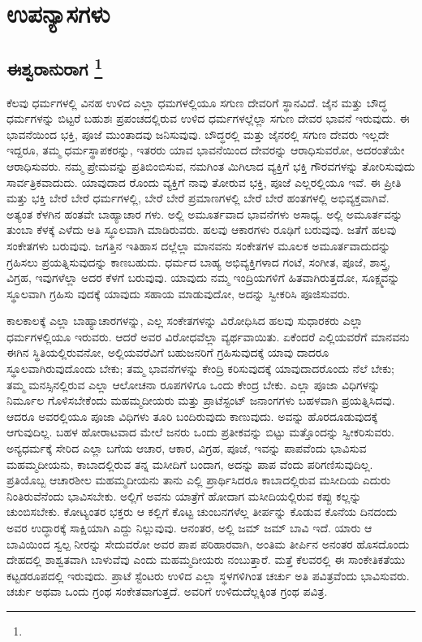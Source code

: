 

\part{ಉಪನ್ಯಾಸಗಳು}

\mainmatter

\chapter[ಈಶ್ವರಾನುರಾಗ]{ಈಶ್ವರಾನುರಾಗ \protect\footnote{}}

ಕೆಲವು ಧರ್ಮಗಳಲ್ಲಿ ವಿನಹ ಉಳಿದ ಎಲ್ಲಾ ಧಮಗಳಲ್ಲಿಯೂ ಸಗುಣ ದೇವರಿಗೆ ಸ್ಥಾನವಿದೆ. ಜೈನ ಮತ್ತು ಬೌದ್ಧ ಧರ್ಮಗಳನ್ನು ಬಿಟ್ಟರೆ ಬಹುಶಃ ಪ್ರಪಂಚದಲ್ಲಿರುವ ಉಳಿದ ಧರ್ಮಗಳಲ್ಲೆಲ್ಲಾ ಸಗುಣ ದೇವರ ಭಾವನೆ ಇರುವುದು. ಈ ಭಾವನೆಯಿಂದ ಭಕ್ತಿ, ಪೂಜೆ ಮುಂತಾದವು ಜನಿಸುವುವು. ಬೌದ್ಧರಲ್ಲಿ ಮತ್ತು ಜೈನರಲ್ಲಿ ಸಗುಣ ದೇವರು ಇಲ್ಲದೇ ಇದ್ದರೂ, ತಮ್ಮ ಧರ್ಮಸ್ಥಾಪಕರನ್ನು, ಇತರರು ಯಾವ ಭಾವನೆಯಿಂದ ದೇವರನ್ನು ಆರಾಧಿಸುವರೋ, ಅದರಂತೆಯೇ ಆರಾಧಿಸುವರು. ನಮ್ಮ ಪ್ರೇಮವನ್ನು ಪ್ರತಿಬಿಂಬಿಸುವ, ನಮಗಿಂತ ಮಿಗಿಲಾದ ವ್ಯಕ್ತಿಗೆ ಭಕ್ತಿ ಗೌರವಗಳನ್ನು ತೋರಿಸುವುದು ಸಾರ್ವತ್ರಿಕವಾದುದು. ಯಾವುದಾದ ರೊಂದು ವ್ಯಕ್ತಿಗೆ ನಾವು ತೋರುವ ಭಕ್ತಿ, ಪೂಜೆ ಎಲ್ಲರಲ್ಲಿಯೂ ಇವೆ. ಈ ಪ್ರೀತಿ ಮತ್ತು ಭಕ್ತಿ ಬೇರೆ ಬೇರೆ ಧರ್ಮಗಳಲ್ಲಿ, ಬೇರೆ ಬೇರೆ ಪ್ರಮಾಣಗಳಲ್ಲಿ ಬೇರೆ ಬೇರೆ ಹಂತಗಳಲ್ಲಿ ಅಭಿವ್ಯಕ್ತವಾಗಿವೆ. ಅತ್ಯಂತ ಕೆಳಗಿನ ಹಂತವೇ ಬಾಹ್ಯಾಚಾರ ಗಳು. ಅಲ್ಲಿ ಅಮೂರ್ತವಾದ ಭಾವನೆಗಳು ಅಸಾಧ್ಯ. ಅಲ್ಲಿ ಅಮೂರ್ತವನ್ನು ತುಂಬಾ ಕೆಳಕ್ಕೆ ಎಳೆದು ಅತಿ ಸ್ಥೂಲವಾಗಿ ಮಾಡಿರುವರು. ಹಲವು ಆಕಾರಗಳು ರೂಢಿಗೆ ಬರುವುವು. ಜತೆಗೆ ಹಲವು ಸಂಕೇತಗಳು ಬರುವುವು. ಜಗತ್ತಿನ ಇತಿಹಾಸ ದಲ್ಲೆಲ್ಲಾ ಮಾನವನು ಸಂಕೇತಗಳ ಮೂಲಕ ಅಮೂರ್ತವಾದುದನ್ನು ಗ್ರಹಿಸಲು ಪ್ರಯತ್ನಿಸುವುದನ್ನು ಕಾಣಬಹುದು. ಧರ್ಮದ ಬಾಹ್ಯ ಅಭಿವ್ಯಕ್ತಿಗಳಾದ ಗಂಟೆ, ಸಂಗೀತ, ಪೂಜೆ, ಶಾಸ್ತ್ರ, ವಿಗ್ರಹ, ಇವುಗಳೆಲ್ಲಾ ಅದರ ಕೆಳಗೆ ಬರುವುವು. ಯಾವುದು ನಮ್ಮ ಇಂದ್ರಿಯಗಳಿಗೆ ಹಿತವಾಗಿರುತ್ತದೋ, ಸೂಕ್ಷ್ಮವನ್ನು ಸ್ಥೂಲವಾಗಿ ಗ್ರಹಿಸು ವುದಕ್ಕೆ ಯಾವುದು ಸಹಾಯ ಮಾಡುವುದೋ, ಅದನ್ನು ಸ್ವೀಕರಿಸಿ ಪೂಜಿಸುವರು.

ಕಾಲಕಾಲಕ್ಕೆ ಎಲ್ಲಾ ಬಾಹ್ಯಾಚಾರಗಳನ್ನು, ಎಲ್ಲ ಸಂಕೇತಗಳನ್ನು ವಿರೋಧಿಸಿದ ಹಲವು ಸುಧಾರಕರು ಎಲ್ಲಾ ಧರ್ಮಗಳಲ್ಲಿಯೂ ಇರುವರು. ಆದರೆ ಅವರ ವಿರೋಧವೆಲ್ಲಾ ವ್ಯರ್ಥವಾಯಿತು. ಏಕೆಂದರೆ ಎಲ್ಲಿಯವರೆಗೆ ಮಾನವನು ಈಗಿನ ಸ್ಥಿತಿಯಲ್ಲಿರುವನೋ, ಅಲ್ಲಿಯವರೆವಿಗೆ ಬಹುಜನರಿಗೆ ಗ್ರಹಿಸುವುದಕ್ಕೆ ಯಾವು ದಾದರೂ ಸ್ಥೂಲವಾಗಿರುವುದೊಂದು ಬೇಕು; ತಮ್ಮ ಭಾವನೆಗಳನ್ನು ಕೇಂದ್ರಿ ಕರಿಸುವುದಕ್ಕೆ ಯಾವುದಾದರೊಂದು ನೆಲೆ ಬೇಕು; ತಮ್ಮ ಮನಸ್ಸಿನಲ್ಲಿರುವ ಎಲ್ಲಾ ಆಲೋಚನಾ ರೂಪಗಳಿಗೂ ಒಂದು ಕೇಂದ್ರ ಬೇಕು. ಎಲ್ಲಾ ಪೂಜಾ ವಿಧಿಗಳನ್ನು ನಿರ್ಮೂಲ ಗೊಳಿಸಬೇಕೆಂದು ಮಹಮ್ಮದೀಯರು ಮತ್ತು ಪ್ರಾಟೆಸ್ಟಂಟ್​ ಜನಾಂಗಗಳು ಬಹಳವಾಗಿ ಪ್ರಯತ್ನಿಸಿದವು. ಆದರೂ ಅವರಲ್ಲಿಯೂ ಪೂಜಾ ವಿಧಿಗಳು ತೂರಿ ಬಂದಿರುವುದು ಕಾಣುವುದು. ಅವನ್ನು ಹೊರದೂಡುವುದಕ್ಕೆ ಆಗುವುದಿಲ್ಲ. ಬಹಳ ಹೋರಾಟವಾದ ಮೇಲೆ ಜನರು ಒಂದು ಪ್ರತೀಕವನ್ನು ಬಿಟ್ಟು ಮತ್ತೊಂದನ್ನು ಸ್ವೀಕರಿಸುವರು. ಅನ್ಯಧರ್ಮಕ್ಕೆ ಸೇರಿದ ಎಲ್ಲಾ ಬಗೆಯ ಆಚಾರ, ಆಕಾರ, ವಿಗ್ರಹ, ಪೂಜೆ, ಇವನ್ನು ಪಾಪವೆಂದು ಭಾವಿಸುವ ಮಹಮ್ಮದೀಯನು, ಕಾಬಾದಲ್ಲಿರುವ ತನ್ನ ಮಸೀದಿಗೆ ಬಂದಾಗ, ಅದನ್ನು ಪಾಪ ವೆಂದು ಪರಿಗಣಿಸುವುದಿಲ್ಲ. ಪ್ರತಿಯೊಬ್ಬ ಆಚಾರಶೀಲ ಮಹಮ್ಮದೀಯನು ತಾನು ಎಲ್ಲಿ ಪ್ರಾರ್ಥಿಸಿದರೂ ಕಾಬಾದಲ್ಲಿರುವ ಮಸೀದಿಯ ಎದುರು ನಿಂತಿರುವೆನೆಂದು ಭಾವಿಸಬೇಕು. ಅಲ್ಲಿಗೆ ಅವನು ಯಾತ್ರೆಗೆ ಹೋದಾಗ ಮಸೀದಿಯಲ್ಲಿರುವ ಕಪ್ಪು ಕಲ್ಲನ್ನು ಚುಂಬಿಸಬೇಕು. ಕೋಟ್ಯಂತರ ಭಕ್ತರು ಆ ಕಲ್ಲಿಗೆ ಕೊಟ್ಟ ಚುಂಬನಗಳೆಲ್ಲ ತೀರ್ಪನ್ನು ಕೊಡುವ ಕೊನೆಯ ದಿನದಂದು ಅವರ ಉದ್ಧಾರಕ್ಕೆ ಸಾಕ್ಷಿಯಾಗಿ ಎದ್ದು ನಿಲ್ಲುವುವು. ಆನಂತರ, ಅಲ್ಲಿ ಜಮ್​ ಜಮ್​ ಬಾವಿ ಇದೆ. ಯಾರು ಆ ಬಾವಿಯಿಂದ ಸ್ವಲ್ಪ ನೀರನ್ನು ಸೇದುವರೋ ಅವರ ಪಾಪ ಪರಿಹಾರವಾಗಿ, ಅಂತಿಮ ತೀರ್ಪಿನ ಅನಂತರ ಹೊಸದೊಂದು ದೇಹದಲ್ಲಿ ಶಾಶ್ವತವಾಗಿ ಬಾಳುವೆವು ಎಂದು ಮಹಮ್ಮದೀಯರು ನಂಬುತ್ತಾರೆ. ಮತ್ತೆ ಕೆಲವರಲ್ಲಿ ಈ ಸಾಂಕೇತಿಕತೆಯು ಕಟ್ಟಡರೂಪದಲ್ಲಿ ಇರುವುದು. ಪ್ರಾಟೆ ಸ್ಟೆಂಟರು ಉಳಿದ ಎಲ್ಲಾ ಸ್ಥಳಗಳಿಗಿಂತ ಚರ್ಚು ಅತಿ ಪವಿತ್ರವೆಂದು ಭಾವಿಸುವರು. ಚರ್ಚು ಅಥವಾ ಒಂದು ಗ್ರಂಥ ಸಂಕೇತವಾಗುತ್ತದೆ. ಅವರಿಗೆ ಉಳಿದುದೆಲ್ಲಕ್ಕಿಂತ ಗ್ರಂಥ ಪವಿತ್ರ.

